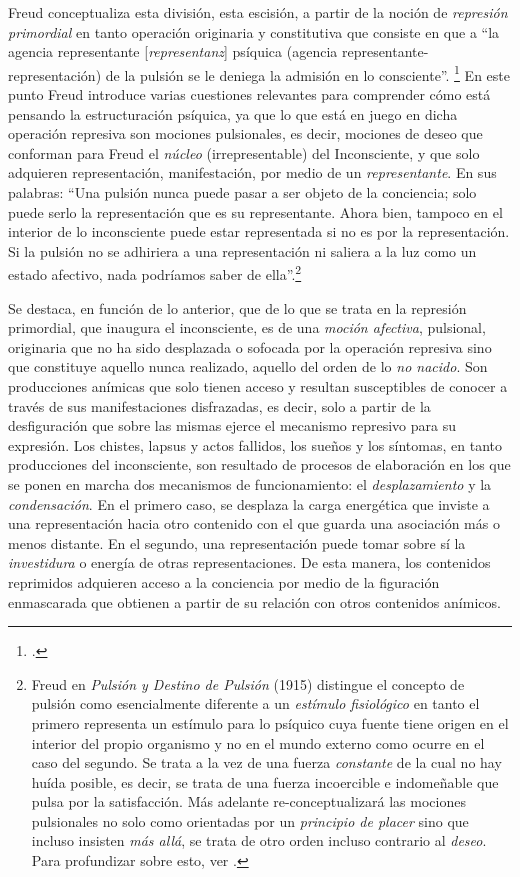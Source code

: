 Freud conceptualiza esta división, esta escisión, a partir de la noción de \emph{represión primordial} en tanto operación originaria y constitutiva que consiste en que a \enquote{la agencia representante {[}\emph{representanz}{]} psíquica (agencia representante-representación) de la pulsión se le deniega la admisión en lo consciente}. \footcite[][143]{@7103-FREUD1990} En este punto Freud introduce varias cuestiones relevantes para comprender cómo está pensando la estructuración psíquica, ya que lo que está en juego en dicha operación represiva son mociones pulsionales, es decir, mociones de deseo que conforman para Freud el \emph{núcleo} (irrepresentable) del Inconsciente, y que solo adquieren representación, manifestación, por medio de un \emph{representante}. En sus palabras: \enquote{Una pulsión nunca puede pasar a ser objeto de la conciencia; solo puede serlo la representación que es su representante. Ahora bien, tampoco en el interior de lo inconsciente puede estar representada si no es por la representación. Si la pulsión no se adhiriera a una representación ni saliera a la luz como un estado afectivo, nada podríamos saber de ella}.\footnote{\cite[][173]{@7031-FREUD2008} Freud en \emph{Pulsión y Destino de Pulsión} (1915) distingue el concepto de pulsión como esencialmente diferente a un \emph{estímulo fisiológico} en tanto el primero representa un estímulo para lo psíquico cuya fuente tiene origen en el interior del propio organismo y no en el mundo externo como ocurre en el caso del segundo. Se trata a la vez de una fuerza \emph{constante} de la cual no hay huída posible, es decir, se trata de una fuerza incoercible e indomeñable que pulsa por la satisfacción. Más adelante re-conceptualizará las mociones pulsionales no solo como orientadas por un \emph{principio de placer} sino que incluso insisten \emph{más allá}, se trata de otro orden incluso contrario al \emph{deseo}. Para profundizar sobre esto, ver \cite[]{@7104-FREUD1984}.}

Se destaca, en función de lo anterior, que de lo que se trata en la represión primordial, que inaugura el inconsciente, es de una \emph{moción afectiva}, pulsional, originaria que no ha sido desplazada o sofocada por la operación represiva sino que constituye aquello nunca realizado, aquello del orden de lo \emph{no nacido}. Son producciones anímicas que solo tienen acceso y resultan susceptibles de conocer a través de sus manifestaciones disfrazadas, es decir, solo a partir de la desfiguración que sobre las mismas ejerce el mecanismo represivo para su expresión. Los chistes, lapsus y actos fallidos, los sueños y los síntomas, en tanto producciones del inconsciente, son resultado de procesos de elaboración en los que se ponen en marcha dos mecanismos de funcionamiento: el \emph{desplazamiento} y la \emph{condensación}. En el primero caso, se desplaza la carga energética que inviste a una representación hacia otro contenido con el que guarda una asociación más o menos distante. En el segundo, una representación puede tomar sobre sí la \emph{investidura} o energía de otras representaciones. De esta manera, los contenidos reprimidos adquieren acceso a la conciencia por medio de la figuración enmascarada que obtienen a partir de su relación con otros contenidos anímicos.

